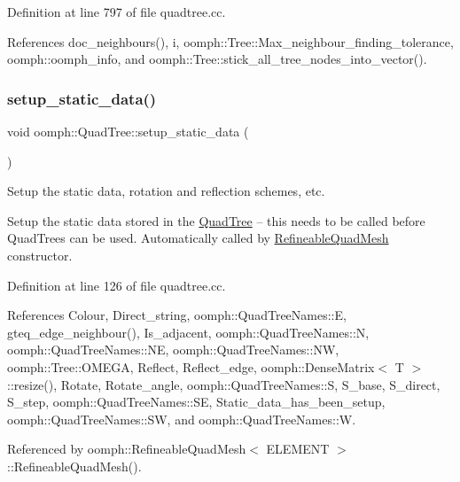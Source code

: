 Definition at line 797 of file quadtree.\+cc.



References doc\+\_\+neighbours(), i, oomph\+::\+Tree\+::\+Max\+\_\+neighbour\+\_\+finding\+\_\+tolerance, oomph\+::oomph\+\_\+info, and oomph\+::\+Tree\+::stick\+\_\+all\+\_\+tree\+\_\+nodes\+\_\+into\+\_\+vector().

\mbox{\label{classoomph_1_1QuadTree_a5b5c9d4ab6addac9252cb1dadd5b6903}} 
\subsubsection{\texorpdfstring{setup\+\_\+static\+\_\+data()}{setup\_static\_data()}}
{\footnotesize\ttfamily void oomph\+::\+Quad\+Tree\+::setup\+\_\+static\+\_\+data (\begin{DoxyParamCaption}{ }\end{DoxyParamCaption})\hspace{0.3cm}{\ttfamily [static]}}



Setup the static data, rotation and reflection schemes, etc. 

Setup the static data stored in the \hyperlink{classoomph_1_1QuadTree}{Quad\+Tree} -- this needs to be called before Quad\+Trees can be used. Automatically called by \hyperlink{classoomph_1_1RefineableQuadMesh}{Refineable\+Quad\+Mesh} constructor. 

Definition at line 126 of file quadtree.\+cc.



References Colour, Direct\+\_\+string, oomph\+::\+Quad\+Tree\+Names\+::E, gteq\+\_\+edge\+\_\+neighbour(), Is\+\_\+adjacent, oomph\+::\+Quad\+Tree\+Names\+::N, oomph\+::\+Quad\+Tree\+Names\+::\+NE, oomph\+::\+Quad\+Tree\+Names\+::\+NW, oomph\+::\+Tree\+::\+O\+M\+E\+GA, Reflect, Reflect\+\_\+edge, oomph\+::\+Dense\+Matrix$<$ T $>$\+::resize(), Rotate, Rotate\+\_\+angle, oomph\+::\+Quad\+Tree\+Names\+::S, S\+\_\+base, S\+\_\+direct, S\+\_\+step, oomph\+::\+Quad\+Tree\+Names\+::\+SE, Static\+\_\+data\+\_\+has\+\_\+been\+\_\+setup, oomph\+::\+Quad\+Tree\+Names\+::\+SW, and oomph\+::\+Quad\+Tree\+Names\+::W.



Referenced by oomph\+::\+Refineable\+Quad\+Mesh$<$ E\+L\+E\+M\+E\+N\+T $>$\+::\+Refineable\+Quad\+Mesh().


